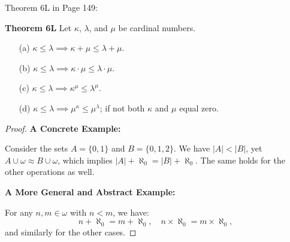Theorem 6L in Page 149:
\begin{leftbar}
    \textbf{Theorem 6L} Let \(\kappa\), \(\lambda\), and \(\mu\) be cardinal numbers.

    \begin{enumerate}
        \item[(a)] \(\kappa \leq \lambda \implies \kappa + \mu \leq \lambda + \mu\).
        \item[(b)] \(\kappa \leq \lambda \implies \kappa \cdot \mu \leq \lambda \cdot \mu\).
        \item[(c)] \(\kappa \leq \lambda \implies \kappa^\mu \leq \lambda^\mu\).
        \item[(d)] \(\kappa \leq \lambda \implies \mu^\kappa \leq \mu^\lambda\); if not both \(\kappa\) and \(\mu\) equal zero.
    \end{enumerate}
\end{leftbar}
\begin{proof}
    \textbf{A Concrete Example:}

    Consider the sets \(A = \{0, 1\}\) and \(B = \{0, 1, 2\}\).  
    We have \(|A| < |B|\), yet \(A \cup \omega \approx B \cup \omega\), which implies \(|A| + \aleph_0 = |B| + \aleph_0\).  
    The same holds for the other operations as well.

    \textbf{A More General and Abstract Example:}

    For any \(n, m \in \omega\) with \(n < m\), we have:
    \[
    n + \aleph_0 = m + \aleph_0, \quad n \times \aleph_0 = m \times \aleph_0,
    \]
    and similarly for the other cases.

\end{proof}

